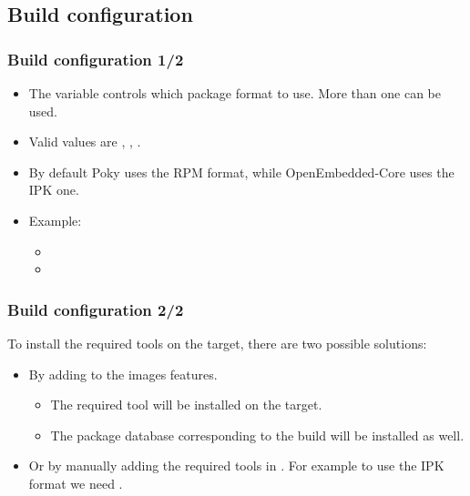 \subsection{Build configuration}

\begin{frame}
  \frametitle{Build configuration 1/2}
  \begin{itemize}
    \item The  variable controls which package
      format to use. More than one can be used.
    \item Valid values are , ,
      .
    \item By default Poky uses the RPM format, while OpenEmbedded-Core
      uses the IPK one.
    \item Example:
      \begin{itemize}
        \item {}
        \item {}
      \end{itemize}
  \end{itemize}
\end{frame}

\begin{frame}
  \frametitle{Build configuration 2/2}
  To install the required tools on the target, there are two
  possible solutions:
  \begin{itemize}
    \item By adding  to the images
      features.
      \begin{itemize}
        \item The required tool will be installed on the target.
        \item The package database corresponding to the build will be
          installed as well.
      \end{itemize}
    \item Or by manually adding the required tools in
      . For example to use the IPK format we
      need .
  \end{itemize}
\end{frame}

